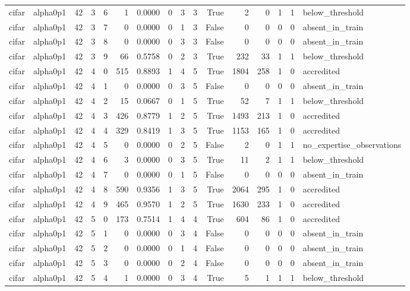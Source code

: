 \begin{tabular}{llrrrrrrrrrrrrrl}
cifar & alpha0p1 & 42 & 3 & 6 & 1 & 0.0000 & 0 & 3 & 3 & True & 2 & 0 & 1 & 1 & below\_threshold \\
cifar & alpha0p1 & 42 & 3 & 7 & 0 & 0.0000 & 0 & 1 & 3 & False & 0 & 0 & 0 & 0 & absent\_in\_train \\
cifar & alpha0p1 & 42 & 3 & 8 & 0 & 0.0000 & 0 & 3 & 3 & False & 0 & 0 & 0 & 0 & absent\_in\_train \\
cifar & alpha0p1 & 42 & 3 & 9 & 66 & 0.5758 & 0 & 2 & 3 & True & 232 & 33 & 1 & 1 & below\_threshold \\
cifar & alpha0p1 & 42 & 4 & 0 & 515 & 0.8893 & 1 & 4 & 5 & True & 1804 & 258 & 1 & 0 & accredited \\
cifar & alpha0p1 & 42 & 4 & 1 & 0 & 0.0000 & 0 & 3 & 5 & False & 0 & 0 & 0 & 0 & absent\_in\_train \\
cifar & alpha0p1 & 42 & 4 & 2 & 15 & 0.0667 & 0 & 1 & 5 & True & 52 & 7 & 1 & 1 & below\_threshold \\
cifar & alpha0p1 & 42 & 4 & 3 & 426 & 0.8779 & 1 & 2 & 5 & True & 1493 & 213 & 1 & 0 & accredited \\
cifar & alpha0p1 & 42 & 4 & 4 & 329 & 0.8419 & 1 & 3 & 5 & True & 1153 & 165 & 1 & 0 & accredited \\
cifar & alpha0p1 & 42 & 4 & 5 & 0 & 0.0000 & 0 & 2 & 5 & False & 2 & 0 & 1 & 1 & no\_expertise\_observations \\
cifar & alpha0p1 & 42 & 4 & 6 & 3 & 0.0000 & 0 & 3 & 5 & True & 11 & 2 & 1 & 1 & below\_threshold \\
cifar & alpha0p1 & 42 & 4 & 7 & 0 & 0.0000 & 0 & 1 & 5 & False & 0 & 0 & 0 & 0 & absent\_in\_train \\
cifar & alpha0p1 & 42 & 4 & 8 & 590 & 0.9356 & 1 & 3 & 5 & True & 2064 & 295 & 1 & 0 & accredited \\
cifar & alpha0p1 & 42 & 4 & 9 & 465 & 0.9570 & 1 & 2 & 5 & True & 1630 & 233 & 1 & 0 & accredited \\
cifar & alpha0p1 & 42 & 5 & 0 & 173 & 0.7514 & 1 & 4 & 4 & True & 604 & 86 & 1 & 0 & accredited \\
cifar & alpha0p1 & 42 & 5 & 1 & 0 & 0.0000 & 0 & 3 & 4 & False & 0 & 0 & 0 & 0 & absent\_in\_train \\
cifar & alpha0p1 & 42 & 5 & 2 & 0 & 0.0000 & 0 & 1 & 4 & False & 0 & 0 & 0 & 0 & absent\_in\_train \\
cifar & alpha0p1 & 42 & 5 & 3 & 0 & 0.0000 & 0 & 2 & 4 & False & 0 & 0 & 0 & 0 & absent\_in\_train \\
cifar & alpha0p1 & 42 & 5 & 4 & 1 & 0.0000 & 0 & 3 & 4 & True & 5 & 1 & 1 & 1 & below\_threshold \\

\end{tabular}
